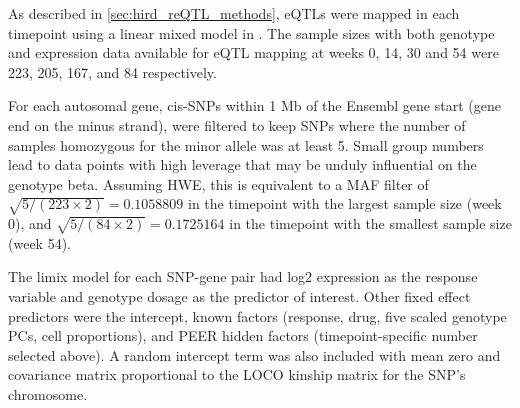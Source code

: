 As described in \cref{sec:hird_reQTL_methods},
\glspl{eQTL} were mapped in each timepoint using a linear mixed model in .
%
%
The sample sizes with both genotype and expression data available for \gls{eQTL} mapping at weeks 0, 14, 30 and 54 were 223, 205, 167, and 84 respectively.

%
For each autosomal gene, cis-\glspl{SNP} within 1 Mb of the Ensembl gene start (gene end on the minus strand),
were filtered to keep \glspl{SNP} where the number of samples homozygous for the minor allele was at least 5.
Small group numbers lead to data points with high leverage that may be unduly influential on the genotype beta.
Assuming \gls{HWE}, this is equivalent to a \gls{MAF} filter of 
$\sqrt{5/(223\times2)} = \num{0.1058809}$ in the timepoint with the largest sample size (week 0),
and $\sqrt{5/(84\times2)} = \num{0.1725164}$ in the timepoint with the smallest sample size (week 54).

The limix model for each \gls{SNP}-gene pair had 
log2 expression as the response variable
and genotype dosage as the predictor of interest.
Other fixed effect predictors were
the intercept,
known factors (response, drug, five scaled genotype \glspl{PC}, cell proportions), 
and PEER hidden factors (timepoint-specific number selected above).
A random intercept term was also included with mean zero and covariance matrix proportional to the \gls{LOCO} kinship matrix for the \gls{SNP}'s chromosome.

